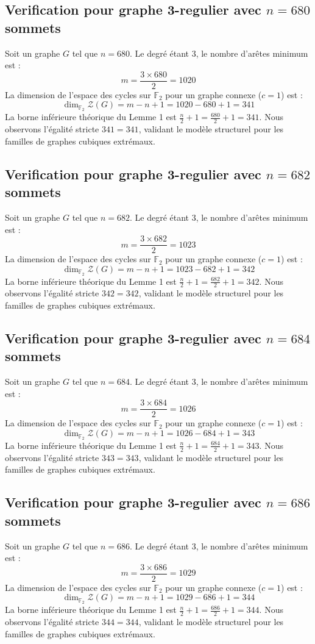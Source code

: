\documentclass[11pt,a4paper]{article}
\begin{document}
\subsection{Verification pour graphe 3-regulier avec $n=680$ sommets}
Soit un graphe $G$ tel que $n = 680$. Le degré étant 3, le nombre d'arêtes minimum est :
$$ m = \frac{3 \times 680}{2} = 1020 $$
La dimension de l'espace des cycles sur $\mathbb{F}_2$ pour un graphe connexe ($c=1$) est :
$$ \dim_{\mathbb{F}_2} \mathcal{Z}(G) = m - n + 1 = 1020 - 680 + 1 = 341 $$
La borne inférieure théorique du Lemme 1 est $\frac{n}{2} + 1 = \frac{680}{2} + 1 = 341$.
Nous observons l'égalité stricte $341 = 341$, validant le modèle structurel pour les familles de graphes cubiques extrémaux.

\subsection{Verification pour graphe 3-regulier avec $n=682$ sommets}
Soit un graphe $G$ tel que $n = 682$. Le degré étant 3, le nombre d'arêtes minimum est :
$$ m = \frac{3 \times 682}{2} = 1023 $$
La dimension de l'espace des cycles sur $\mathbb{F}_2$ pour un graphe connexe ($c=1$) est :
$$ \dim_{\mathbb{F}_2} \mathcal{Z}(G) = m - n + 1 = 1023 - 682 + 1 = 342 $$
La borne inférieure théorique du Lemme 1 est $\frac{n}{2} + 1 = \frac{682}{2} + 1 = 342$.
Nous observons l'égalité stricte $342 = 342$, validant le modèle structurel pour les familles de graphes cubiques extrémaux.

\subsection{Verification pour graphe 3-regulier avec $n=684$ sommets}
Soit un graphe $G$ tel que $n = 684$. Le degré étant 3, le nombre d'arêtes minimum est :
$$ m = \frac{3 \times 684}{2} = 1026 $$
La dimension de l'espace des cycles sur $\mathbb{F}_2$ pour un graphe connexe ($c=1$) est :
$$ \dim_{\mathbb{F}_2} \mathcal{Z}(G) = m - n + 1 = 1026 - 684 + 1 = 343 $$
La borne inférieure théorique du Lemme 1 est $\frac{n}{2} + 1 = \frac{684}{2} + 1 = 343$.
Nous observons l'égalité stricte $343 = 343$, validant le modèle structurel pour les familles de graphes cubiques extrémaux.

\subsection{Verification pour graphe 3-regulier avec $n=686$ sommets}
Soit un graphe $G$ tel que $n = 686$. Le degré étant 3, le nombre d'arêtes minimum est :
$$ m = \frac{3 \times 686}{2} = 1029 $$
La dimension de l'espace des cycles sur $\mathbb{F}_2$ pour un graphe connexe ($c=1$) est :
$$ \dim_{\mathbb{F}_2} \mathcal{Z}(G) = m - n + 1 = 1029 - 686 + 1 = 344 $$
La borne inférieure théorique du Lemme 1 est $\frac{n}{2} + 1 = \frac{686}{2} + 1 = 344$.
Nous observons l'égalité stricte $344 = 344$, validant le modèle structurel pour les familles de graphes cubiques extrémaux.
\end{document}
